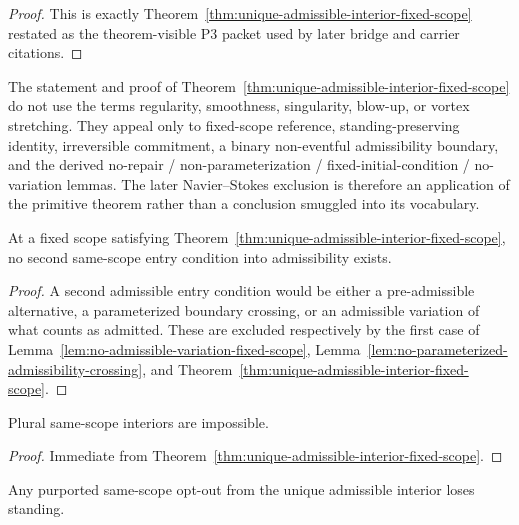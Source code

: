 \begin{proof}
This is exactly Theorem~\ref{thm:unique-admissible-interior-fixed-scope} restated as the theorem-visible P3 packet used by later bridge and carrier citations.
\end{proof}

\begin{remark}\label{rem:anti-circularity-primitive-layer}
The statement and proof of Theorem~\ref{thm:unique-admissible-interior-fixed-scope} do not use the terms regularity, smoothness, singularity, blow-up, or vortex stretching. They appeal only to fixed-scope reference, standing-preserving identity, irreversible commitment, a binary non-eventful admissibility boundary, and the derived no-repair / non-parameterization / fixed-initial-condition / no-variation lemmas. The later Navier--Stokes exclusion is therefore an application of the primitive theorem rather than a conclusion smuggled into its vocabulary.
\end{remark}

\begin{corollary}\label{cor:no-alternative-entry-condition}
At a fixed scope satisfying Theorem~\ref{thm:unique-admissible-interior-fixed-scope}, no second same-scope entry condition into admissibility exists.
\end{corollary}

\begin{proof}
A second admissible entry condition would be either a pre-admissible alternative, a parameterized boundary crossing, or an admissible variation of what counts as admitted. These are excluded respectively by the first case of Lemma~\ref{lem:no-admissible-variation-fixed-scope}, Lemma~\ref{lem:no-parameterized-admissibility-crossing}, and Theorem~\ref{thm:unique-admissible-interior-fixed-scope}.
\end{proof}

\begin{corollary}\label{cor:no-plural-admissible-interiors}
Plural same-scope interiors are impossible.
\end{corollary}

\begin{proof}
Immediate from Theorem~\ref{thm:unique-admissible-interior-fixed-scope}.
\end{proof}

\begin{corollary}\label{cor:no-standing-preserving-optout}
Any purported same-scope opt-out from the unique admissible interior loses standing.
\end{corollary}


